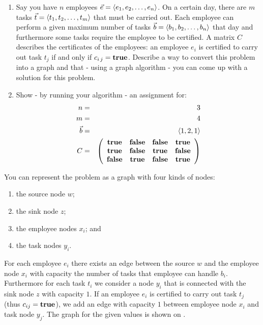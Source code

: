 \documentclass{article}
\begin{document}
\begin{exercise}
\begin{enumerate}
\item Say you have $n$ employees $\vec{e}=\left\langle e_1,e_2,\ldots,e_n \right\rangle$. On a certain day, there are $m$ tasks $\vec{t}=\left\langle t_1,t_2,\ldots,t_m \right\rangle$ that must be carried out. Each employee can perform a given maximum number of tasks $\vec{b}=\left\langle b_1,b_2,\ldots,b_n \right\rangle$ that day and furthermore some tasks require the employee to be certified. A matrix $C$ describes the certificates of the employees: an employee $e_i$ is certified to carry out task $t_j$ if and only if $c_{i\,j}=\mbox{\bf true}$. Describe a way to convert this problem into a graph and that - using a graph algorithm - you can come up with a solution for this problem.
\item Show - by running your algorithm - an assignment for:
\begin{eqnarray}
n&=&3\\
m&=&4\\
\vec{b}&=&\left\langle 1,2,1 \right\rangle\\
C&=&\left( \begin{array}{cccc}
\mbox{\bf true}&\mbox{\bf false}&\mbox{\bf false}&\mbox{\bf true}\\
\mbox{\bf true}&\mbox{\bf false}&\mbox{\bf true}&\mbox{\bf false}\\
\mbox{\bf false}&\mbox{\bf true}&\mbox{\bf false}&\mbox{\bf true}\\
\end{array} \right)
\end{eqnarray}
\end{enumerate}
\begin{answer}
You can represent the problem as a graph with four kinds of nodes:
\begin{enumerate}
 \item the source node $w$;
 \item the sink node $z$;
 \item the employee nodes $x_i$; and
 \item the task nodes $y_i$.
\end{enumerate}
For each employee $e_i$ there exists an edge between the source $w$ and the employee node $x_i$ with capacity the number of tasks that employee can handle $b_i$. Furthermore for each task $t_i$ we consider a node $y_i$ that is connected with the sink node $z$ with capacity $1$. If an employee $e_i$ is certified to carry out task $t_j$ (thus $c_{ij}=\mbox{\bf true}$), we add an edge with capacity $1$ between employee node $x_i$ and task node $y_j$. The graph for the given values is shown on .

\end{answer}
\end{exercise}
\end{document}
